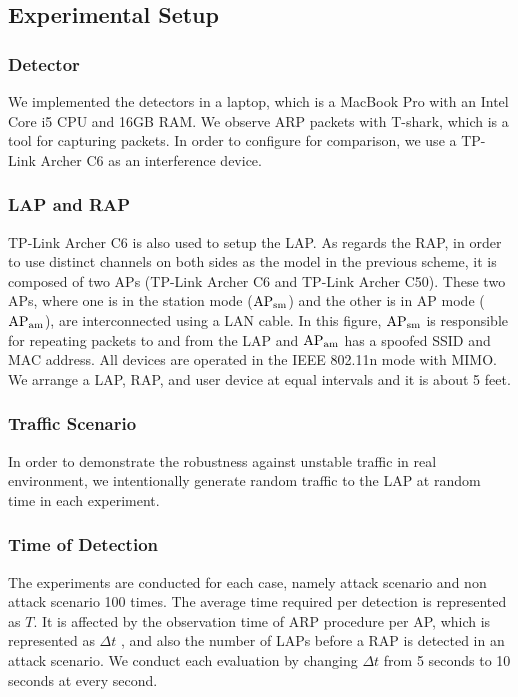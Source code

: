 \documentclass[conference]{IEEEtran}
\begin{document}
\subsection{Experimental Setup}
\subsubsection{Detector}
We implemented the detectors in a laptop, which is a MacBook Pro with an Intel Core i5 CPU and 16GB RAM.
We observe ARP packets with T-shark, which is a tool for capturing packets\cite{wire}.
In order to configure \cite{previous} for comparison, we use a TP-Link Archer C6 as an interference device.

\subsubsection{LAP and RAP}
TP-Link Archer C6 is also used to setup the LAP.
As regards the RAP, in order to use distinct channels on both sides as the model in the previous scheme, it is composed of two APs (TP-Link Archer C6 and TP-Link Archer C50).
These two APs, where one is in the station mode ($\rm AP_{sm}$) and the other is in AP mode ($\rm AP_{am}$), are interconnected using a LAN cable.
In this figure, $\rm AP_{sm}$ is responsible for repeating packets to and from the LAP and $\rm AP_{am}$ has a spoofed SSID and MAC address.
All devices are operated in the IEEE 802.11n mode with MIMO.
We arrange a LAP, RAP, and user device at equal intervals and it is about 5 feet.

\subsubsection{Traffic Scenario}
In order to demonstrate the robustness against unstable traffic in real environment, we intentionally generate random traffic to the LAP at random time in each experiment.

\subsubsection{Time of Detection}
The experiments are conducted for each case, namely attack scenario and non attack scenario 100 times.
The average time required per detection is represented as $T$.
It is affected by the observation time of ARP procedure per AP, which is represented as $\Delta t$ , and also the number of LAPs before a RAP is detected in an attack scenario.
We conduct each evaluation by changing $\Delta t$ from 5 seconds to 10 seconds at every second.
\end{document}
